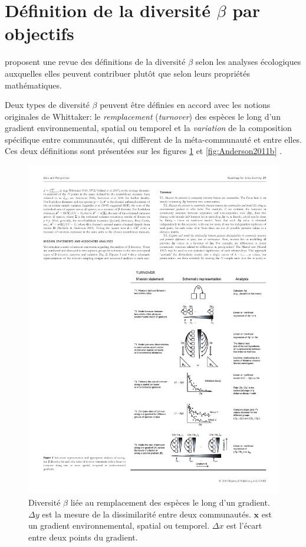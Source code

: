 \documentclass[
  11pt,
  french,
  a4paper,
  extrafontsizes,onecolumn,openright
  ]{memoir}
\begin{document}
\normalsize

\hypertarget{duxe9finition-de-la-diversituxe9-beta-par-objectifs}{%
\section{\texorpdfstring{Définition de la diversité \(\beta\) par objectifs}{Définition de la diversité \textbackslash beta par objectifs}}\label{duxe9finition-de-la-diversituxe9-beta-par-objectifs}}

\textcite{Anderson2011} proposent une revue des définitions de la diversité \(\beta\) selon les analyses écologiques auxquelles elles peuvent contribuer plutôt que selon leurs propriétés mathématiques.

Deux types de diversité \(\beta\) peuvent être définies \autocite{Vellend2001} en accord avec les notions originales de Whittaker: le \emph{remplacement} (\emph{turnover}) des espèces le long d'un gradient environnemental, spatial ou temporel et la \emph{variation} de la composition spécifique entre communautés, qui diffèrent de la méta-communauté et entre elles.
Ces deux définitions sont présentées sur les figures \ref{fig:Anderson2011a} et \ref{fig:Anderson2011b} \autocite{Anderson2011}.



\scriptsize

\begin{figure}

{\centering \includegraphics[width=0.8\linewidth]{images/Anderson2011a} 

}

\caption{Diversité \(\beta\) liée au remplacement des espèces le long d'un gradient. \(\Delta{y}\) est la mesure de la dissimilarité entre deux communautés. \(\mathbf{x}\) est un gradient environnemental, spatial ou temporel. \(\Delta{x}\) est l'écart entre deux points du gradient.}\label{fig:Anderson2011a}
\end{figure}
\end{document}
